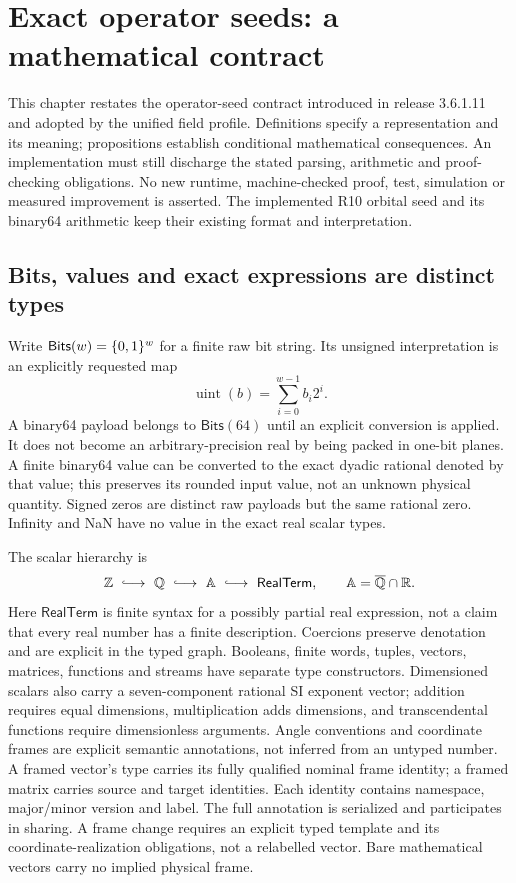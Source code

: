 \section{Exact operator seeds: a mathematical contract}
\label{sec:exact-core}
This chapter restates the  operator-seed contract introduced in
release 3.6.1.11 and adopted by the unified field profile. Definitions specify
a representation and its meaning;
propositions establish conditional mathematical consequences. An implementation
must still discharge the stated parsing, arithmetic and proof-checking
obligations. No new runtime, machine-checked proof, test, simulation or measured
improvement is asserted. The implemented R10 orbital seed and its binary64
arithmetic keep their existing format and interpretation.

\subsection{Bits, values and exact expressions are distinct types}
Write $\mathsf{Bits}(w)=\{0,1\}^w$ for a finite raw bit string. Its unsigned
interpretation is an explicitly requested map
\[
 \operatorname{uint}(b)=\sum_{i=0}^{w-1}b_i2^i.
\]
A binary64 payload belongs to $\mathsf{Bits}(64)$ until an explicit conversion
is applied. It does not become an arbitrary-precision real by being packed in
one-bit planes. A finite binary64 value can be converted to the exact dyadic
rational denoted by that value; this preserves its rounded input value, not an
unknown physical quantity. Signed zeros are distinct raw payloads but the same
rational zero. Infinity and NaN have no value in the exact real scalar types.

The scalar hierarchy is
\[
 \Z\ \lhook\joinrel\longrightarrow\ \mathbb Q
 \ \lhook\joinrel\longrightarrow\ \mathbb A
 \ \lhook\joinrel\longrightarrow\ \mathsf{RealTerm},
 \qquad \mathbb A=\overline{\mathbb Q}\cap\R.
\]
Here $\mathsf{RealTerm}$ is finite syntax for a possibly partial real expression,
not a claim that every real number has a finite description. Coercions preserve
denotation and are explicit in the typed graph. Booleans, finite words, tuples,
vectors, matrices, functions and streams have separate type constructors.
Dimensioned scalars also carry a seven-component rational SI exponent vector;
addition requires equal dimensions, multiplication adds dimensions, and
transcendental functions require dimensionless arguments. Angle conventions and
coordinate frames are explicit semantic annotations, not inferred from an
untyped number. A framed vector's type carries its fully qualified nominal frame
identity; a framed matrix carries source and target identities. Each identity
contains namespace, major/minor version and label. The full annotation is
serialized and participates in sharing. A frame change requires an explicit
typed template and its coordinate-realization obligations, not a relabelled
vector. Bare mathematical vectors carry no implied physical frame.

